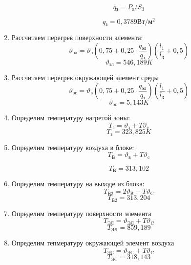 \begin{enumerate}[label={\arabic*.}]
\begin{equation}
  q\mathrm{_з} = P\mathrm{_з}/S\mathrm{_3}
\end{equation}

$$q\mathrm{_з} = 0,3789 \mathrm{Вт/м^2}$$

\item Рассчитаем перегрев поверхности элемента:
  \begin{equation}
    \vartheta\mathrm{_{эл}} = \vartheta\mathrm{_з}(0,75 + 0,25 \cdot \frac{q\mathrm{_{эл}}}{q\mathrm{_{з}}})(\frac{l_1}{l_3} + 0,5)
  \end{equation}
  $$\vartheta\mathrm{_{эл}} = 546,189K$$

  \item Рассчитаем перегрев окружающей элемент среды
  \begin{equation}
    \vartheta\mathrm{_{эс}} = \vartheta\mathrm{_в}(0,75 + 0,25 \cdot \frac{q\mathrm{_{эл}}}{q\mathrm{_{з}}})(\frac{l_1}{l_3} + 0,5)
  \end{equation}
  $$\vartheta\mathrm{_{эс}} = 5,143K$$

\item Определим температуру нагретой зоны:
  \begin{equation}
    T\mathrm{_з}  = \vartheta\mathrm{_з} + T\vartheta\mathrm{_c}
  \end{equation}
  $$T\mathrm{_з} = 323,825K$$

\item Определим температуру воздуха в блоке:
  \begin{equation}
    T\mathrm{_В} = \vartheta\mathrm{_в} + T\vartheta\mathrm{_c}
    \end{equation}

    $$T\mathrm{_В} = 313,102$$

  \item Определим температуру на выходе из блока:
    \begin{equation}
      T\mathrm{_{В2}} = 2\vartheta\mathrm{_В} + T\vartheta\mathrm{_C}
    \end{equation}
    $$T\mathrm{_{В2}} = 313,204$$

  \item Определим температуру поверхности элемента
    \begin{equation}
      T\mathrm{_{ЭЛ}} = \vartheta\mathrm{_{ЭЛ}} + T\vartheta\mathrm{_C}
    \end{equation}
    $$ T\mathrm{_{ЭЛ}} = 859,189 $$
    
  \item Определим тепмературу окружающей элемент воздуха
    \begin{equation}
      T\mathrm{_{ЭС}} = \vartheta\mathrm{_{ЭС}} + T\vartheta\mathrm{_C}
    \end{equation}
    $$T\mathrm{_{ЭС}} = 318,143$$
  \end{enumerate}

  \newpage
